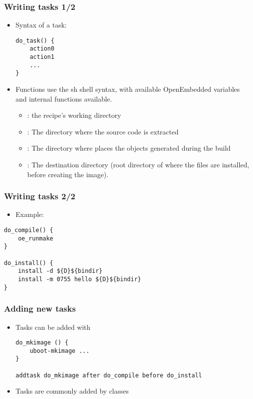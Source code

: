 \begin{frame}[fragile]
  \frametitle{Writing tasks 1/2}
  \begin{itemize}
    \item Syntax of a task:
  \begin{block}{}
    \begin{verbatim}
do_task() {
    action0
    action1
    ...
}
    \end{verbatim}
  \end{block}
    \item Functions use the sh shell syntax, with available
      OpenEmbedded variables and internal functions available.
      \begin{itemize}
        \item {}: the recipe's working directory
        \item {}: The directory where the source code is extracted
        \item {}: The directory where  places the objects
          generated during the build
        \item {}: The destination directory (root directory of where
          the files are installed, before creating the image).
      \end{itemize}
  \end{itemize}
\end{frame}

\begin{frame}[fragile]
  \frametitle{Writing tasks 2/2}
  \begin{itemize}
    \item Example:
  \end{itemize}
  \begin{block}{}
    \begin{verbatim}
do_compile() {
    oe_runmake
}

do_install() {
    install -d ${D}${bindir}
    install -m 0755 hello ${D}${bindir}
}
    \end{verbatim}
  \end{block}
\end{frame}

\begin{frame}[fragile]
  \frametitle{Adding new tasks}
  \begin{itemize}
  \item Tasks can be added with 
  \begin{block}{}
    \begin{verbatim}
do_mkimage () {
    uboot-mkimage ...
}

addtask do_mkimage after do_compile before do_install
    \end{verbatim}
  \end{block}
  \item Tasks are commonly added by classes
  \end{itemize}
\end{frame}

